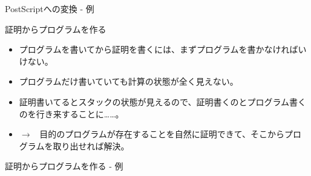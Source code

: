 \documentclass[cjk, 14pt, dvipdfm]{beamer}
\begin{document}
\begin{frame}{PostScriptへの変換 - 例}

\end{frame}

\begin{frame}{証明からプログラムを作る}

  \begin{itemize}
    \item プログラムを書いてから証明を書くには、まずプログラムを書かなければいけない。
    \item プログラムだけ書いていても計算の状態が全く見えない。
    \item 証明書いてるとスタックの状態が見えるので、証明書くのとプログラム書くのを行き来することに……。
    \item $\rightarrow$ \, 目的のプログラムが存在することを自然に証明できて、そこからプログラムを取り出せれば解決。
  \end{itemize}

\end{frame}

\begin{frame}{証明からプログラムを作る - 例}

\end{frame}
\end{document}
